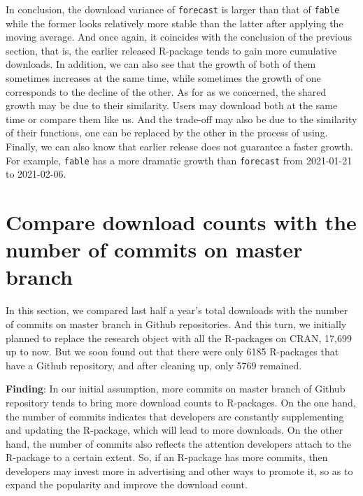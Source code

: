\documentclass[
]{book}
\newenvironment{discovery}[1]{%
  \begin{tcolorbox}[colback=blue!30,colframe=blue!80!black]#1}{\end{tcolorbox}}
\begin{document}
In conclusion, the download variance of \texttt{forecast} is larger than that of \texttt{fable} while the former looks relatively more stable than the latter after applying the moving average. And once again, it coincides with the conclusion of the previous section, that is, the earlier released R-package tends to gain more cumulative downloads. In addition, we can also see that the growth of both of them sometimes increases at the same time, while sometimes the growth of one corresponds to the decline of the other. As for as we concerned, the shared growth may be due to their similarity. Users may download both at the same time or compare them like us. And the trade-off may also be due to the similarity of their functions, one can be replaced by the other in the process of using. Finally, we can also know that earlier release does not guarantee a faster growth. For example, \texttt{fable} has a more dramatic growth than \texttt{forecast} from 2021-01-21 to 2021-02-06.

\hypertarget{compare-download-counts-with-the-number-of-commits-on-master-branch}{%
\section{Compare download counts with the number of commits on master branch}\label{compare-download-counts-with-the-number-of-commits-on-master-branch}}

In this section, we compared last half a year's total downloads with the number of commits on master branch in Github repositories. And this turn, we initially planned to replace the research object with all the R-packages on CRAN, 17,699 up to now. But we soon found out that there were only 6185 R-packages that have a Github repository, and after cleaning up, only 5769 remained.

\begin{discovery}
\textbf{Finding}: In our initial assumption, more commits on master
branch of Github repository tends to bring more download counts to
R-packages. On the one hand, the number of commits indicates that
developers are constantly supplementing and updating the R-package,
which will lead to more downloads. On the other hand, the number of
commits also reflects the attention developers attach to the R-package
to a certain extent. So, if an R-package has more commits, then
developers may invest more in advertising and other ways to promote it,
so as to expand the popularity and improve the download count.
\end{discovery}
\end{document}
